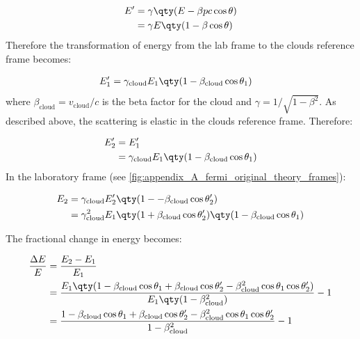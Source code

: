 \begin{equation}
    \begin{aligned}
    E'&=\gamma\qty(E-\beta pc\cos\theta ) \\
&=\gamma E\qty(1-\beta \cos\theta ) 
    \end{aligned}
\end{equation}
\noindent Therefore the transformation of energy from the lab frame to the clouds reference frame becomes:

\begin{equation}
    \begin{aligned}
    E_1'&=\gamma_\text{cloud}E_1\qty(1-\beta_\text{cloud}\cos\theta_1)
    \end{aligned}
\end{equation}
\noindent where $\beta_\text{cloud}=v_\text{cloud}/c$ is the beta factor for the cloud and $\gamma=1/\sqrt{1-\beta^2}$. As described above, the scattering is elastic in the clouds reference frame. Therefore:

\begin{equation}
    \begin{aligned}
    E_2'&=E_1' \\
&=\gamma_\text{cloud}E_1\qty(1-\beta_\text{cloud}\cos\theta_1)
    \end{aligned}
\end{equation}
\noindent In the laboratory frame (see \autoref{fig:appendix_A_fermi_original_theory_frames}):

\begin{equation}
    \begin{aligned}
    E_2&=\gamma_\text{cloud}E_2'\qty(1--\beta_\text{cloud}\cos\theta_2') \\
&=\gamma_\text{cloud}^2E_1\qty(1+\beta_\text{cloud}\cos\theta_2')\qty(1-\beta_\text{cloud}\cos\theta_1)
    \end{aligned}
\end{equation}

The fractional change in energy becomes:

\begin{equation}
    \begin{aligned}
    \frac{\Delta E}{E}&=\frac{E_2-E_1}{E_1} \\
&=\frac{E_1\qty(1-\beta_\text{cloud}\cos\theta_1+\beta_\text{cloud}\cos\theta_2'-\beta_\text{cloud}^2\cos\theta_1\cos\theta_2')}{E_1\qty(1-\beta_\text{cloud}^2)}-1 \\
&=\frac{1-\beta_\text{cloud}\cos\theta_1+\beta_\text{cloud}\cos\theta_2'-\beta_\text{cloud}^2\cos\theta_1\cos\theta_2'}{1-\beta_\text{cloud}^2}-1
    \end{aligned} \label{eq:appendix_A_fermi_orig_fractional_change_ind}
\end{equation}

